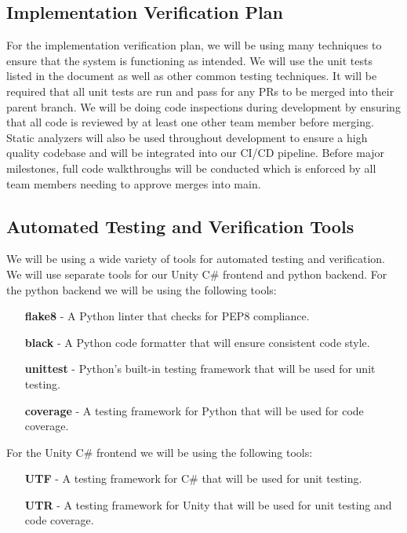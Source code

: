 \documentclass[12pt, titlepage]{article}
\begin{document}
\subsection{Implementation Verification Plan}

For the implementation verification plan, we will be using many techniques to ensure that the system is functioning as intended.
We will use the unit tests listed in the document as well as other common testing techniques.
It will be required that all unit tests are run and pass for any PRs to be merged into their parent branch.
We will be doing code inspections during development by ensuring that all code is reviewed by at least one other team member before merging.
Static analyzers will also be used throughout development to ensure a high quality codebase and will be integrated into our CI/CD pipeline.
Before major milestones, full code walkthroughs will be conducted which is enforced by all team members needing to approve merges into main.

\subsection{Automated Testing and Verification Tools}

  \noindent We will be using a wide variety of tools for automated testing and verification.
  We will use separate tools for our Unity C\# frontend and python backend.
  \bigskip
  \newline
  For the python backend we will be using the following tools:
  \begin{itemize}
    \item [\textbf{flake8}] - A Python linter that checks for PEP8 compliance.
    \item [\textbf{black}] - A Python code formatter that will ensure consistent code style.
    \item [\textbf{unittest}] - Python's built-in testing framework that will be used for unit testing.
    \item [\textbf{coverage}] - A testing framework for Python that will be used for code coverage.
  \end{itemize}

  \bigskip
  \noindent For the Unity C\# frontend we will be using the following tools:
  \begin{itemize}
    \item [\textbf{UTF}] - A testing framework for C\# that will be used for unit testing.
    \item [\textbf{UTR}] - A testing framework for Unity that will be used for unit testing and code coverage.
  \end{itemize}
\end{document}
